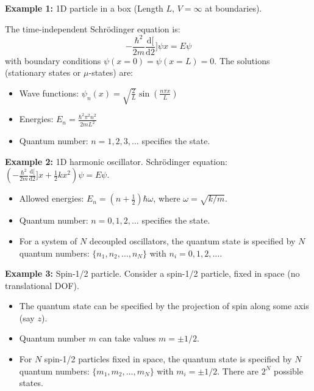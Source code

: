 \documentclass[11pt]{article}
\newcommand{\deriv}[2]{\frac{\mathrm{d} #1}{\mathrm{d} #2}}
\begin{document}
\textbf{Example 1:} 1D particle in a box (Length $L$, $V=\infty$ at boundaries).
\begin{center}
\end{center}
The time-independent Schrödinger equation is:
\[ -\frac{\hbar^2}{2m} \deriv[2]{\psi}{x} = E\psi \]
with boundary conditions $\psi(x=0)=\psi(x=L)=0$.
The solutions (stationary states or $\mu$-states) are:
\begin{itemize}
    \item Wave functions: $\psi_n(x) = \sqrt{\frac{2}{L}} \sin\left(\frac{n\pi x}{L}\right)$
    \item Energies: $E_n = \frac{\hbar^2 \pi^2 n^2}{2mL^2}$
    \item Quantum number: $n=1, 2, 3, \dots$ specifies the state.
\end{itemize}

\textbf{Example 2:} 1D harmonic oscillator.
Schrödinger equation: $\left(-\frac{\hbar^2}{2m}\deriv[2]{}{x} + \frac{1}{2}kx^2\right)\psi = E\psi$.
\begin{itemize}
    \item Allowed energies: $E_n = (n + \frac{1}{2})\hbar\omega$, where $\omega = \sqrt{k/m}$.
    \item Quantum number: $n=0, 1, 2, \dots$ specifies the state.
    \item For a system of $N$ decoupled oscillators, the quantum state is specified by $N$ quantum numbers: $\{n_1, n_2, \dots, n_N\}$ with $n_i = 0, 1, 2, \dots$.
\end{itemize}

\textbf{Example 3:} Spin-1/2 particle.
Consider a spin-1/2 particle, fixed in space (no translational DOF).
\begin{itemize}
    \item The quantum state can be specified by the projection of spin along some axis (say $z$).
    \item Quantum number $m$ can take values $m = \pm 1/2$.
    \item For $N$ spin-1/2 particles fixed in space, the quantum state is specified by $N$ quantum numbers: $\{m_1, m_2, \dots, m_N\}$ with $m_i = \pm 1/2$. There are $2^N$ possible states.
\end{itemize}
\end{document}
